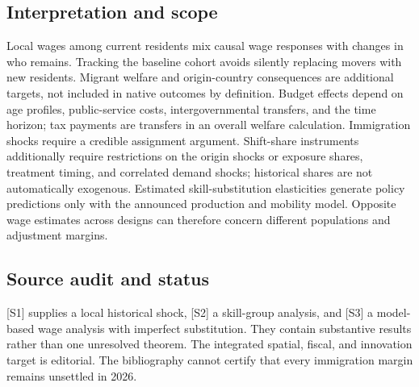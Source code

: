 \documentclass[11pt,a4paper]{article}
\begin{document}
\subsection*{Interpretation and scope}
Local wages among current residents mix causal wage responses with changes in who remains. Tracking the baseline cohort avoids silently replacing movers with new residents. Migrant welfare and origin-country consequences are additional targets, not included in native outcomes by definition. Budget effects depend on age profiles, public-service costs, intergovernmental transfers, and the time horizon; tax payments are transfers in an overall welfare calculation. Immigration shocks require a credible assignment argument. Shift-share instruments additionally require restrictions on the origin shocks or exposure shares, treatment timing, and correlated demand shocks; historical shares are not automatically exogenous. Estimated skill-substitution elasticities generate policy predictions only with the announced production and mobility model. Opposite wage estimates across designs can therefore concern different populations and adjustment margins.
\subsection*{Source audit and status}
[S1] supplies a local historical shock, [S2] a skill-group analysis, and [S3] a model-based wage analysis with imperfect substitution. They contain substantive results rather than one unresolved theorem. The integrated spatial, fiscal, and innovation target is editorial. The bibliography cannot certify that every immigration margin remains unsettled in 2026.
\end{document}
